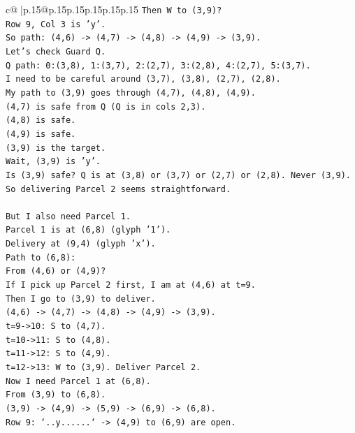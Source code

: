 \documentclass{article}
\begin{document}
{\begin{supertabular}{c@{$\;$}|p{.15\linewidth}@{}p{.15\linewidth}p{.15\linewidth}p{.15\linewidth}p{.15\linewidth}p{.15\linewidth}}
{{{\texttt{Then W to (3,9)?} \\
\texttt{Row 9, Col 3 is 'y'.} \\
\texttt{So path: (4,6) {-}> (4,7) {-}> (4,8) {-}> (4,9) {-}> (3,9).} \\
\texttt{Let's check Guard Q.} \\
\texttt{Q path: 0:(3,8), 1:(3,7), 2:(2,7), 3:(2,8), 4:(2,7), 5:(3,7).} \\
\texttt{I need to be careful around (3,7), (3,8), (2,7), (2,8).} \\
\texttt{My path to (3,9) goes through (4,7), (4,8), (4,9).} \\
\texttt{(4,7) is safe from Q (Q is in cols 2,3).} \\
\texttt{(4,8) is safe.} \\
\texttt{(4,9) is safe.} \\
\texttt{(3,9) is the target.} \\
\texttt{Wait, (3,9) is 'y'.} \\
\texttt{Is (3,9) safe? Q is at (3,8) or (3,7) or (2,7) or (2,8). Never (3,9).} \\
\texttt{So delivering Parcel 2 seems straightforward.} \\
\\ 
\texttt{But I also need Parcel 1.} \\
\texttt{Parcel 1 is at (6,8) (glyph '1').} \\
\texttt{Delivery at (9,4) (glyph 'x').} \\
\texttt{Path to (6,8):} \\
\texttt{From (4,6) or (4,9)?} \\
\texttt{If I pick up Parcel 2 first, I am at (4,6) at t=9.} \\
\texttt{Then I go to (3,9) to deliver.} \\
\texttt{(4,6) {-}> (4,7) {-}> (4,8) {-}> (4,9) {-}> (3,9).} \\
\texttt{t=9{-}>10: S to (4,7).} \\
\texttt{t=10{-}>11: S to (4,8).} \\
\texttt{t=11{-}>12: S to (4,9).} \\
\texttt{t=12{-}>13: W to (3,9). Deliver Parcel 2.} \\
\texttt{Now I need Parcel 1 at (6,8).} \\
\texttt{From (3,9) to (6,8).} \\
\texttt{(3,9) {-}> (4,9) {-}> (5,9) {-}> (6,9) {-}> (6,8).} \\
\texttt{Row 9: `..y......` {-}> (4,9) to (6,9) are open.} \\
}}}
\end{supertabular}}
\end{document}
